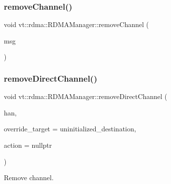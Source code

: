 \mbox{\label{structvt_1_1rdma_1_1_r_d_m_a_manager_a240f9f8c6697b4fc94c8a8b1b4d6c737}} 
\subsubsection{\texorpdfstring{remove\+Channel()}{removeChannel()}}
{\footnotesize\ttfamily void vt\+::rdma\+::\+R\+D\+M\+A\+Manager\+::remove\+Channel (\begin{DoxyParamCaption}\item[{\hyperlink{namespacevt_1_1rdma_a1273aeddd73c1ffac0d7383ef7a314d8}{Destroy\+Channel} $\ast$}]{msg }\end{DoxyParamCaption})\hspace{0.3cm}{\ttfamily [static]}}

\mbox{\label{structvt_1_1rdma_1_1_r_d_m_a_manager_a9767f9beafd9a352ae2b9f0a189f7346}} 
\subsubsection{\texorpdfstring{remove\+Direct\+Channel()}{removeDirectChannel()}}
{\footnotesize\ttfamily void vt\+::rdma\+::\+R\+D\+M\+A\+Manager\+::remove\+Direct\+Channel (\begin{DoxyParamCaption}\item[{\hyperlink{namespacevt_a10442579ec4e7ebef223818e64bcf908}{R\+D\+M\+A\+\_\+\+Handle\+Type} const \&}]{han,  }\item[{\hyperlink{namespacevt_a866da9d0efc19c0a1ce79e9e492f47e2}{Node\+Type} const \&}]{override\+\_\+target = {\ttfamily uninitialized\+\_\+destination},  }\item[{\hyperlink{namespacevt_ae0a5a7b18cc99d7b732cb4d44f46b0f3}{Action\+Type} const \&}]{action = {\ttfamily nullptr} }\end{DoxyParamCaption})}



Remove channel. 


